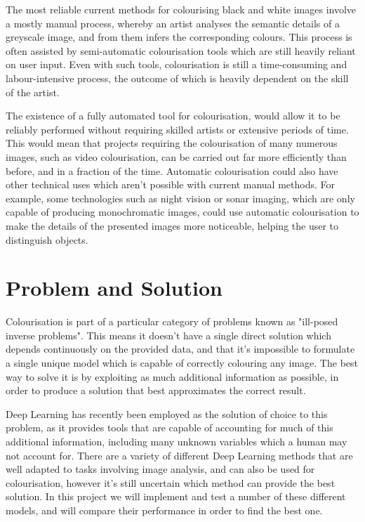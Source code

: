 \documentclass{l4proj}
\begin{document}
The most reliable current methods for colourising black and white images involve a mostly manual process, whereby an artist analyses the semantic details of a greyscale image, and from them infers the corresponding colours. This process is often assisted by semi-automatic colourisation tools which are still heavily reliant on user input. Even with such tools, colourisation is still a time-consuming and labour-intensive process, the outcome of which is heavily dependent on the skill of the artist.

The existence of a fully automated tool for colourisation, would allow it to be reliably performed without requiring skilled artists or extensive periods of time. This would mean that projects requiring the colourisation of many numerous images, such as video colourisation, can be carried out far more efficiently than before, and in a fraction of the time. Automatic colourisation could also have other technical uses which aren't possible with current manual methods. For example, some technologies such as night vision or sonar imaging, which are only capable of producing monochromatic images, could use automatic colourisation to make the details of the presented images more noticeable, helping the user to distinguish objects.

\section{Problem and Solution}

Colourisation is part of a particular category of problems known as "ill-posed inverse problems". This means it doesn't have a single direct solution which depends continuously on the provided data, and that it's impossible to formulate a single unique model which is capable of correctly colouring any image. The best way to solve it is by exploiting as much additional information as possible, in order to produce a solution that best approximates the correct result. 

Deep Learning has recently been employed as the solution of choice to this problem, as it provides tools that are capable of accounting for much of this additional information, including many unknown variables which a human may not account for. There are a variety of different Deep Learning methods that are well adapted to tasks involving image analysis, and can also be used for colourisation, however it's still uncertain which method can provide the best solution. In this project we will implement and test a number of these different models, and will compare their performance in order to find the best one.
\end{document}
